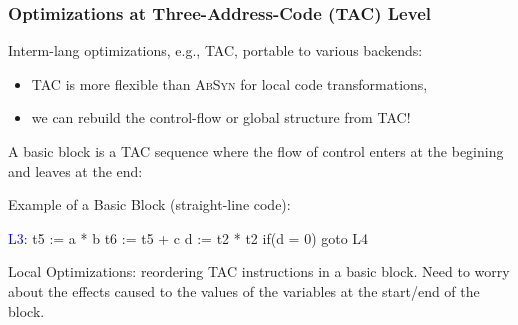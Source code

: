 \documentclass{beamer}
\newcommand{\blue}[1]{\textcolor{Blue}{{#1}}}
\renewcommand{\emph}[1]{\textcolor{structure}{#1}}
\newcommand{\emp}[1]{\textcolor{DikuRed}{ #1}}
\begin{document}
\begin{frame}[fragile,t]
    \frametitle{Optimizations at Three-Address-Code (TAC) Level}

Interm-lang optimizations, e.g., \textsc{TAC}, portable to various backends:

\smallskip

\begin{itemize}

\item \textsc{TAC} is more flexible than \textsc{AbSyn} for local code transformations,\smallskip

\item \emph{we can rebuild the control-flow or global structure from \textsc{TAC}!}\smallskip

\end{itemize}

\pause
\bigskip

\emp{A basic block} is a \textsc{TAC} sequence where the flow of control 
enters at the begining and leaves at the end:

\smallskip

\begin{block}{Example of a Basic Block (straight-line code):}
\begin{colorcode}[fontsize=\scriptsize]
\blue{L3:} t5 := a  * b
    t6 := t5 + c
    d  := t2 * t2
    \emp{if(d = 0) goto L4}
\end{colorcode} 
\end{block}


\bigskip

Local Optimizations: reordering \textsc{TAC} instructions in a basic block.\smallskip
Need to \emp{worry about the effects} caused to the values of the variables
at the \emp{start/end of the block}.

\end{frame}
\end{document}
